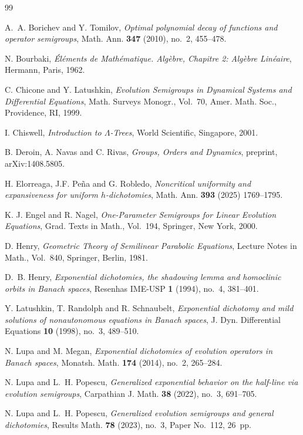 \documentclass[10pt]{amsart}
\numberwithin{equation}{section}
\begin{document}
\begin{thebibliography}{99}

A.~A. Borichev and Y. Tomilov,
\textit{Optimal polynomial decay of functions and operator semigroups},
Math. Ann. \textbf{347} (2010), no.~2, 455--478.

N. Bourbaki,
\textit{\'El\'ements de Math\'ematique. Alg\`ebre, Chapitre 2: Alg\`ebre Lin\'eaire},
Hermann, Paris, 1962.

C. Chicone and Y. Latushkin,
\textit{Evolution Semigroups in Dynamical Systems and Differential Equations},
Math. Surveys Monogr., Vol.~70, Amer. Math. Soc., Providence, RI, 1999.

I. Chiswell,
\textit{Introduction to $\Lambda$-Trees},
World Scientific, Singapore, 2001.

B. Deroin, A. Navas and C. Rivas,
\textit{Groups, Orders and Dynamics},
preprint, arXiv:1408.5805.

H. Elorreaga, J.F. Pe\~na and G. Robledo,
\textit{Noncritical uniformity and expansiveness for uniform $h$-dichotomies},
Math. Ann. \textbf{393}  (2025) 1769–1795.


K. J. Engel and R. Nagel,
\textit{One-Parameter Semigroups for Linear Evolution Equations},
Grad. Texts in Math., Vol.~194, Springer, New York, 2000.

D. Henry,
\textit{Geometric Theory of Semilinear Parabolic Equations},
Lecture Notes in Math., Vol.~840, Springer, Berlin, 1981.

D.~B. Henry,
\textit{Exponential dichotomies, the shadowing lemma and homoclinic orbits in Banach spaces},
Resenhas IME-USP \textbf{1} (1994), no.~4, 381--401.

Y. Latushkin, T. Randolph and R. Schnaubelt,
\textit{Exponential dichotomy and mild solutions of nonautonomous equations in Banach spaces},
J. Dyn. Differential Equations \textbf{10} (1998), no.~3, 489--510.

N. Lupa and M. Megan,
\textit{Exponential dichotomies of evolution operators in Banach spaces},
Monatsh. Math. \textbf{174} (2014), no.~2, 265--284.

N. Lupa and L.~H. Popescu,
\textit{Generalized exponential behavior on the half-line via evolution semigroups},
Carpathian J. Math. \textbf{38} (2022), no.~3, 691--705.

N. Lupa and L.~H. Popescu,
\textit{Generalized evolution semigroups and general dichotomies},
Results Math. \textbf{78} (2023), no.~3, Paper No.~112, 26~pp.



\end{thebibliography}
\end{document}
